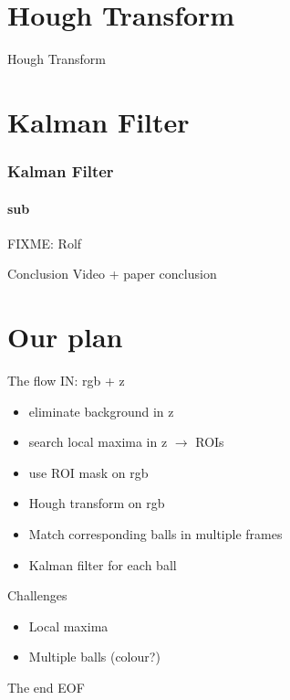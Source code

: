 \documentclass{beamer}
\begin{document}
\section{Hough Transform}

\begin{frame}{Hough Transform}
\color{red}{   FIXME: Thiemo}
\end{frame}

\section{Kalman Filter}

\begin{frame}
\frametitle{Kalman Filter}
\framesubtitle{sub}

FIXME: Rolf

\end{frame}

\begin{frame}{Conclusion}
   Video + paper conclusion
\end{frame}

\section{Our plan}
\begin{frame}{The flow}
IN: rgb + z

\begin{itemize}
	\item eliminate background in z
	\item search local maxima in z $\rightarrow$ ROIs
	\item use ROI mask on rgb
	\item Hough transform on rgb
	\item Match corresponding balls in multiple frames
	\item Kalman filter for each ball
\end{itemize}
\end{frame}

\begin{frame}{Challenges}
\begin{itemize}
	\item Local maxima
	\item Multiple balls (colour?)
\end{itemize}
\end{frame}

\begin{frame}{The end}
EOF
\end{frame}
\end{document}
